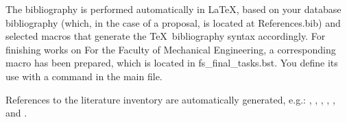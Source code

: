 The bibliography is performed automatically in \LaTeX, based on your database
bibliography (which, in the case of a proposal, is located at References.bib) and selected
macros that generate the \TeX~bibliography syntax accordingly. For finishing works on
For the Faculty of Mechanical Engineering, a corresponding macro has been prepared, which is located in
fs\_final\_tasks.bst. You define its use with a command
\verb|| in the main file.

References to the literature inventory are automatically generated, e.g.: \cite{bazant_1991},
\cite{Doe_1991}, \cite{Bazant_2008}, \cite{Gonzalez_2014, Bazant_2005}
\cite{Bazant_2007, Kogoj_DTD, Merkur_2005, SURS_2009, SURS_2005, MKariera,
Encyclopedia, Posl_app, ZGD, ZOP}, \cite{ISO_2573}, \cite{DIN_4768} and
\cite{JISB0601, Novak_2015}.
